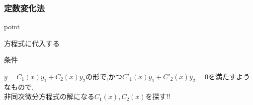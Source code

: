 \documentclass[a4paper]{jsarticle}
\begin{document}
\subsubsection{定数変化法}
\begin{itembox}[l]{point}
    \begin{center}
        方程式に代入する
    \end{center}
\end{itembox}
\begin{itembox}[l]{条件}
    \begin{center}
        $y=C_1\left(x\right)y_1+C_2\left(x\right)y_2$の形で,かつ$C'_1\left(x\right)y_1+C'_2\left(x\right)y_2=0$を満たすようなもので,\\
        非同次微分方程式の解になる$C_1\left(x\right),C_2\left(x\right)$を探す!!
    \end{center}
\end{itembox}
\end{document}
